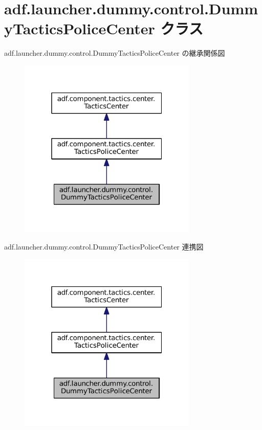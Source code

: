 \hypertarget{classadf_1_1launcher_1_1dummy_1_1control_1_1DummyTacticsPoliceCenter}{}\section{adf.\+launcher.\+dummy.\+control.\+Dummy\+Tactics\+Police\+Center クラス}
\label{classadf_1_1launcher_1_1dummy_1_1control_1_1DummyTacticsPoliceCenter}


adf.\+launcher.\+dummy.\+control.\+Dummy\+Tactics\+Police\+Center の継承関係図
\nopagebreak
\begin{figure}[H]
\begin{center}
\leavevmode
\includegraphics[width=241pt]{classadf_1_1launcher_1_1dummy_1_1control_1_1DummyTacticsPoliceCenter__inherit__graph}
\end{center}
\end{figure}


adf.\+launcher.\+dummy.\+control.\+Dummy\+Tactics\+Police\+Center 連携図
\nopagebreak
\begin{figure}[H]
\begin{center}
\leavevmode
\includegraphics[width=241pt]{classadf_1_1launcher_1_1dummy_1_1control_1_1DummyTacticsPoliceCenter__coll__graph}
\end{center}
\end{figure}
